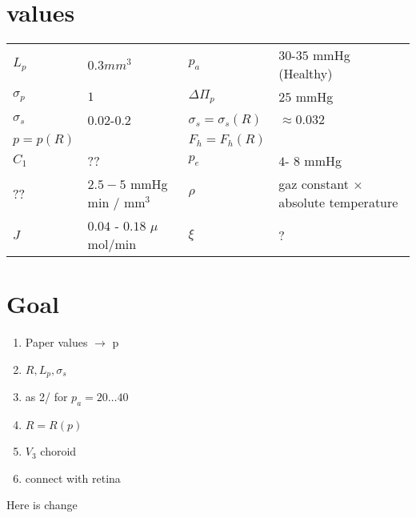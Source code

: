 \documentclass[11pt]{article}
\begin{document}
\section{values}
\begin{tabular}{|l|l||l|l|}
 \hline
$ L_p $ &$0.3 mm^ 3$&$p_a$&  $30$-$35$ mmHg (Healthy)\\

$\sigma_p$& $ 1$& $\Delta \Pi_p$&$25$ mmHg\\

$\sigma_s$& $0.02$-$0.2$& $\sigma_s =  \sigma_s (R)$& $\approx 0.032$\\

$p = p(R)$&& $F_h = F_h(R)$&\\

$C_1 $& ??& $p_e$& $ 4 $- $8$ mmHg\\

?? & $2.5 - 5$ mmHg min / mm$^3$
& $\rho$& gaz constant $ \times$ absolute temperature \\

$J$ & $0.04$ - $0.18$  $\mu$ mol/min

&$\xi$&?\\
\hline
\end{tabular}
\section{Goal}
\begin{enumerate}
\item Paper values $\rightarrow$ p
\item $R,L_p,\sigma_s$
\item as 2/ for $p_a = 20 \ldots 40$
\item $R = R(p)$
\item $V_3$ choroid
\item connect with retina
\end{enumerate}


Here is change
\end{document}
